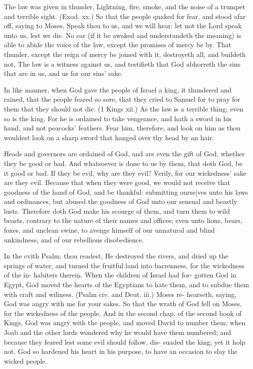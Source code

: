 \documentclass{custom}
\begin{document}
The law was given in thunder, Lightning, fire, smoke, 
and the noise of a trumpet and terrible sight. (Exod. xx.)
So that the people quaked for fear, and stood afar off,
saying to Moses, Speak thou to us, and we will hear:
let not the Lord speak unto us, lest we die. No ear (if 
it be awaked and understandeth the meaning) is able to 
abide the voice of the law, except the promises of mercy 
be by. That thunder, except the reign of mercy be joined 
with it, destroyeth all, and buildeth not, The law is a 
witness against us, and testifieth that God abhorreth the 
sins that are in us, and us for our sins' sake.

In like manner, when God gave the people of Israel 
a king, it thundered and rained, that the people feared 
so sore, that they cried to Samuel for to pray for them 
that they should not die. (1 Kings xii.) As the law is a 
terrible thing; even so is the king. For he is ordained 
to take vengeance, and hath a sword in his hand, and not 
peacocks' feathers. Fear him, therefore, and look on
him as thou wouldest look on a sharp sword that hanged 
over thy head by an hair.

Heads and governors are ordained of God, and are 
even the gift of God, whether they be good or bad. And 
whatsoever is done to us by them, that doth God, be it 
good or bad. If they be evil, why are they evil? Verily, 
for our wickedness' sake are they evil. Because that when 
they were good, we would not receive that goodness of the 
hand of God, and be thankful: submitting ourse|ves unto 
his laws and ordinances, but abused the goodness of God 
unto our sensual and beastly lusts. Therefore doth God 
make his scourge of them, and turn them to wild beasts, 
contrary to the nature of their names and offices; even
unto lions, bears, foxes, and unclean swine, to avenge
himself of our unnatural and blind unkindness, and of 
our rebellious disobedience. 

In the cvith Psalm, thou readest, He destroyed the 
rivers, and dried up the springs of water, and turned the 
fruitful land into barrenness, for the wickedness of the in- 
habiters therein. When the children of Israel had for- 
gotten God in Egypt, God moved the hearts of the 
Egyptians to hate them, and to subdue them with craft 
and wiliness. (Psalm civ. and Deut. iii.) Moses re- 
hearseth, saying, God was angry with me for your 
sakes. So that the wrath of God fell on Moses, for the 
wickedness of the people. And in the second chap. of 
the second book of Kings, God was angry with the people, 
and moved David to number them; when Joab and the 
other lords wondered why he would have them numbered;
and because they feared lest some evil should follow, dis- 
suaded the king; yet it holp not. God so hardened his 
heart in his purpose, to have an occasion to slay the wicked 
people. 
\end{document}
